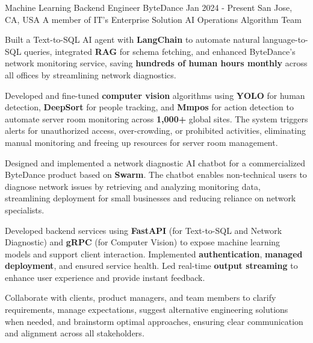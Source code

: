 
\begin{cventries}
  \cventry
    {Machine Learning Backend Engineer} %
    {ByteDance} %
    {Jan 2024 - Present} %
    {San Jose, CA, USA} %
    {A member of IT's Enterprise Solution AI Operations Algorithm Team}
    {
      \begin{cvitems} %
        \item {Built a Text-to-SQL AI agent with \textbf{LangChain} to automate natural language-to-SQL queries, integrated \textbf{RAG} for schema fetching, and enhanced ByteDance’s network monitoring service, saving \textbf{hundreds of human hours monthly} across all offices by streamlining network diagnostics.}
        \item {Developed and fine-tuned \textbf{computer vision} algorithms using \textbf{YOLO} for human detection, \textbf{DeepSort} for people tracking, and \textbf{Mmpos} for action detection to automate server room monitoring across \textbf{1,000+} global sites. The system triggers alerts for unauthorized access, over-crowding, or prohibited activities, eliminating manual monitoring and freeing up resources for server room management.}
        \item {Designed and implemented a network diagnostic AI chatbot for a commercialized ByteDance product based on \textbf{Swarm}. The chatbot enables non-technical users to diagnose network issues by retrieving and analyzing monitoring data, streamlining deployment for small businesses and reducing reliance on network specialists.}
        \item {Developed backend services using \textbf{FastAPI} (for Text-to-SQL and Network Diagnostic) and \textbf{gRPC} (for Computer Vision) to expose machine learning models and support client interaction. Implemented \textbf{authentication}, \textbf{managed deployment}, and ensured service health. Led real-time \textbf{output streaming} to enhance user experience and provide instant feedback.
        }
        \item {Collaborate with clients, product managers, and team members to clarify requirements, manage expectations, suggest alternative engineering solutions when needed, and brainstorm optimal approaches, ensuring clear communication and alignment across all stakeholders.}

\end{cvitems}}
\end{cventries}
